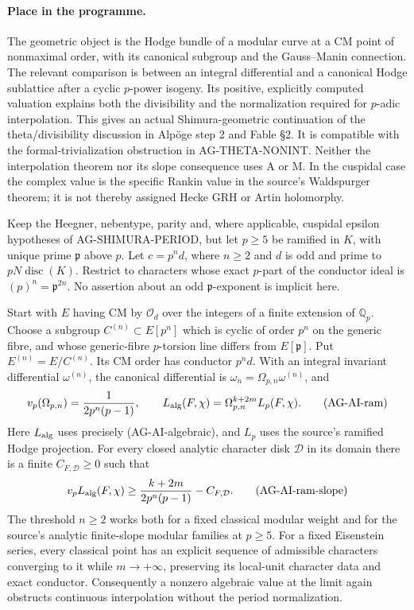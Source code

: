 \paragraph{Place in the programme.}
The geometric object is the Hodge bundle of a modular curve at a CM
point of nonmaximal order, with its canonical subgroup and the
Gauss--Manin connection.  The relevant comparison is between an
integral differential and a canonical Hodge sublattice after a cyclic
$p$-power isogeny.  Its positive, explicitly computed valuation
explains both the divisibility and the normalization required for
$p$-adic interpolation.  This gives an actual Shimura-geometric
continuation of the theta/divisibility discussion in Alpöge step 2
and Fable \S2.  It is compatible with the formal-trivialization
obstruction in AG-THETA-NONINT.  Neither the interpolation theorem
nor its slope consequence uses A or M.  In the cuspidal case the
complex value is the specific Rankin value in the source's
Waldspurger theorem; it is not thereby assigned Hecke GRH or
Artin holomorphy.

\begin{proposition}
Keep the Heegner, nebentype, parity and, where applicable, cuspidal
epsilon hypotheses of AG-SHIMURA-PERIOD, but let $p\geq5$ be
ramified in $K$, with unique prime $\mathfrak p$ above $p$.
Let $c=p^n d$, where $n\geq2$ and $d$ is odd and prime to
$pN\operatorname{disc}(K)$.  Restrict to characters whose exact
$p$-part of the conductor ideal is
$(p)^n=\mathfrak p^{2n}$.  No assertion about an odd
$\mathfrak p$-exponent is implicit here.

Start with $E$ having CM by $\mathcal O_d$ over the integers of
a finite extension of $\mathbb Q_p$.  Choose a subgroup
$C^{(n)}\subset E[p^n]$ which is cyclic of order $p^n$ on the
generic fibre, and whose generic-fibre $p$-torsion line differs
from $E[\mathfrak p]$.  Put $E^{(n)}=E/C^{(n)}$.
Its CM order has conductor $p^n d$.  With an integral invariant
differential $\omega^{(n)}$, the canonical differential is
$\omega_n=\Omega_{p,n}\omega^{(n)}$, and
\[
 v_p(\Omega_{p,n})=\frac1{2p^n(p-1)},\qquad
 L_{\rm alg}(F,\chi)=\Omega_{p,n}^{k+2m}L_p(F,\chi).
                                                        \tag{AG-AI-ram}
\]
Here $L_{\rm alg}$ uses precisely (AG-AI-algebraic), and $L_p$
uses the source's ramified Hodge projection.  For every closed
analytic character disk $\mathcal D$ in its domain there is a
finite $C_{F,\mathcal D}\geq0$ such that
\[
 v_p L_{\rm alg}(F,\chi)
       \geq\frac{k+2m}{2p^n(p-1)}-C_{F,\mathcal D}.       \tag{AG-AI-ram-slope}
\]
The threshold $n\geq2$ works both for a fixed classical modular
weight and for the source's analytic finite-slope modular families
at $p\geq5$.  For a fixed Eisenstein series, every classical point
has an explicit sequence of admissible characters converging to
it while $m\to+\infty$, preserving its local-unit character data
and exact conductor.  Consequently a nonzero algebraic value at
the limit again obstructs continuous interpolation without the
period normalization.
\end{proposition}

